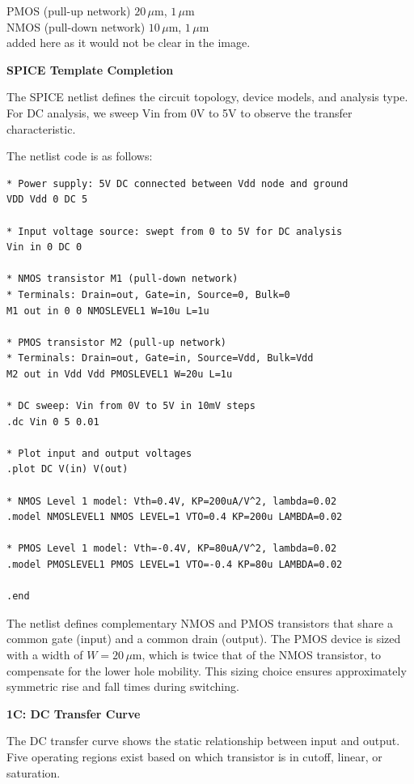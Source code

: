 \documentclass[a4paper,12pt]{article}
\begin{document}
PMOS (pull-up network)  $20\,\mu\text{m}$, $1\,\mu\text{m}$ \\
NMOS (pull-down network) $10\,\mu\text{m}$, $1\,\mu\text{m}$ \\
added here as it would not be clear in the image.

\textbf{SPICE Template Completion}

The SPICE netlist defines the circuit topology, device models, and analysis type. For DC analysis, we sweep Vin from 0V to 5V to observe the transfer characteristic.

The netlist code is as follows:

\begin{lstlisting}[caption=SPICE template completion, label=lst:SPICE_complete]
* Power supply: 5V DC connected between Vdd node and ground
VDD Vdd 0 DC 5

* Input voltage source: swept from 0 to 5V for DC analysis
Vin in 0 DC 0

* NMOS transistor M1 (pull-down network)
* Terminals: Drain=out, Gate=in, Source=0, Bulk=0
M1 out in 0 0 NMOSLEVEL1 W=10u L=1u

* PMOS transistor M2 (pull-up network)
* Terminals: Drain=out, Gate=in, Source=Vdd, Bulk=Vdd
M2 out in Vdd Vdd PMOSLEVEL1 W=20u L=1u

* DC sweep: Vin from 0V to 5V in 10mV steps
.dc Vin 0 5 0.01

* Plot input and output voltages
.plot DC V(in) V(out)

* NMOS Level 1 model: Vth=0.4V, KP=200uA/V^2, lambda=0.02
.model NMOSLEVEL1 NMOS LEVEL=1 VTO=0.4 KP=200u LAMBDA=0.02

* PMOS Level 1 model: Vth=-0.4V, KP=80uA/V^2, lambda=0.02
.model PMOSLEVEL1 PMOS LEVEL=1 VTO=-0.4 KP=80u LAMBDA=0.02

.end
\end{lstlisting}

The netlist defines complementary NMOS and PMOS transistors that share a common gate (input) and a common drain (output). The PMOS device is sized with a width of $W = 20\,\mu\text{m}$, which is twice that of the NMOS transistor, to compensate for the lower hole mobility. This sizing choice ensures approximately symmetric rise and fall times during switching.

\textbf{1C: DC Transfer Curve}

The DC transfer curve shows the static relationship between input and output. Five operating regions exist based on which transistor is in cutoff, linear, or saturation.
\end{document}
